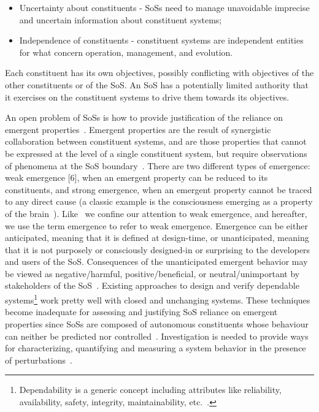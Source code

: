 \begin{itemize}
\item Uncertainty about constituents - SoSs need to manage unavoidable imprecise
and uncertain information about constituent systems; 
\item Independence of constituents - constituent systems
are independent entities for what concern operation, management, and evolution. 
\end{itemize}

Each constituent has its own
objectives, possibly conflicting with objectives of the other constituents or of the SoS. An SoS has a potentially
limited authority that it exercises on the constituent systems to drive them towards its objectives. 

An open problem of SoSs is how to provide justification of the reliance on emergent properties~\cite{Fitzgerald2014}. Emergent
properties are the result of synergistic collaboration between constituent systems, and are those properties
that cannot be expressed at the level of a single constituent system, but require observations of phenomena at the
SoS boundary~\cite{Fitzgerald2014}. There are two different types of emergence: weak emergence [6], when an emergent property
can be reduced to its constituents, and strong emergence, when an emergent property cannot be traced to any
direct cause (a classic example is the consciousness emerging as a property of the brain~\cite{Fitzgerald2014}). Like~\cite{EmergenceAndRefinement,Fitzgerald2014}  we
confine our attention to weak emergence, and hereafter, we use the term emergence to refer to weak emergence.
Emergence can be either anticipated, meaning that it is defined at design-time, or unanticipated, meaning
that it is not purposely or consciously designed-in or surprising to the developers and users of the SoS. Consequences
of the unanticipated emergent behavior may be viewed as negative/harmful, positive/beneficial, or
neutral/unimportant by stakeholders of the SoS~\cite{DDUSA2012}. Existing approaches to design and verify dependable systems\footnote{Dependability is a generic concept including attributes like reliability, availability, safety, integrity, maintainability, etc.~\cite{dependability}.} 
work pretty well with closed and unchanging systems. These techniques become inadequate for assessing
and justifying SoS reliance on emergent properties since SoSs are composed of autonomous constituents
whose behaviour can neither be predicted nor controlled~\cite{Strigini12}. Investigation is needed to provide ways for characterizing, quantifying and measuring a system
behavior in the presence of perturbations~\cite{Strigini12}.

